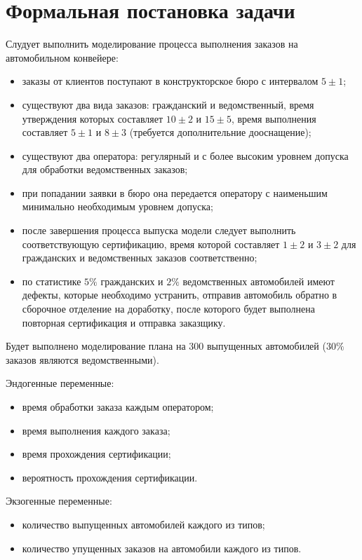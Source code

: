 \section*{Формальная постановка задачи}


Слудует выполнить моделирование процесса выполнения заказов на автомобильном конвейере:
\begin{itemize}
	\item заказы от клиентов поступают в конструкторское бюро с интервалом $5\pm1$;
	\item существуют два вида заказов: гражданский и ведомственный, время утверждения которых составляет $10\pm2$ и $15\pm5$, время выполнения составляет $5\pm1$ и $8\pm3$ (требуется дополнительние дооснащение);
	\item существуют два оператора: регулярный и с более высоким уровнем допуска для обработки ведомственных заказов;
	\item при попадании заявки в бюро она передается оператору с наименьшим минимально необходимым уровнем допуска;
	\item после завершения процесса выпуска модели следует выполнить соответствующую сертификацию, время которой составляет $1\pm2$ и $3\pm2$ для гражданских и ведомственных заказов соответственно;
	\item по статистике $5\%$ гражданских и $2\%$ ведомственных автомобилей имеют дефекты, которые необходимо устранить, отправив автомобиль обратно в сборочное отделение на доработку, после которого будет выполнена повторная сертификация и отправка заказщику.
\end{itemize}

Будет выполнено моделирование плана на $300$ выпущенных автомобилей ($30\%$ заказов являются ведомственными). 


\clearpage

Эндогенные переменные:
\begin{itemize}
	\item время обработки заказа каждым оператором;
	\item время выполнения каждого заказа;
	\item время прохождения сертификации;
	\item вероятность прохождения сертификации.
\end{itemize}

Экзогенные переменные:
\begin{itemize}
	\item количество выпущенных автомобилей каждого из типов;
	\item количество упущенных заказов на автомобили каждого из типов.
\end{itemize}



